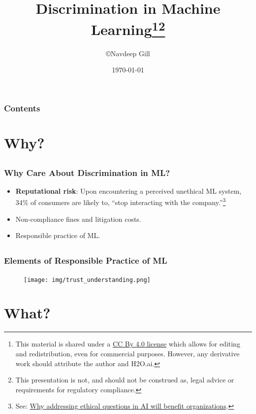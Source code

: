 \documentclass[11pt,
               		aspectratio=169,
               		hyperref={colorlinks}
               		]{beamer}
\author{\copyright\hspace{1pt}Navdeep Gill}
\title{Discrimination in Machine Learning\footnote{\tiny{This material is shared under a \href{https://creativecommons.org/licenses/by/4.0/deed.ast}{CC By 4.0 license} which allows for editing and redistribution, even for commercial purposes. However, any derivative work should attribute the author and H2O.ai.}}\footnote{\tiny{This presentation is not, and should not be construed as, legal advice or requirements for regulatory compliance.}}}
\subtitle{\scriptsize{}}
\institute{\href{https://www.h2o.ai}{H\textsubscript{2}O.ai}}
\date{\today}
\begin{document}
	\maketitle
	\begin{frame}
		\frametitle{Contents}
		\tableofcontents{}
	\end{frame}
	\section{Why?}
		\subsection*{}
		\begin{frame}				
			\frametitle{Why Care About Discrimination in ML?}
			\begin{itemize}
				\Large
				\item \textbf{Reputational risk}: Upon encountering a perceived unethical ML system, 34\% of consumers are likely to, ``stop interacting with the company.''\footnote{\scriptsize{See: \href{https://www.capgemini.com/research/why-addressing-ethical-questions-in-ai-will-benefit-organizations/}{Why addressing ethical questions in AI will benefit organizations}.}}
				\item Non-compliance fines and litigation costs.
				\item Responsible practice of ML. 
			\end{itemize}
		\end{frame}
		\subsection*{}
		\begin{frame}
			\frametitle{Elements of Responsible Practice of ML}
		  	\begin{figure}[htb]
    				\begin{center}
      					\texttt{[image: img/trust\_understanding.png]}
    				\end{center}
  			\end{figure}
		\end{frame}
	\section{What?}
\end{document}
